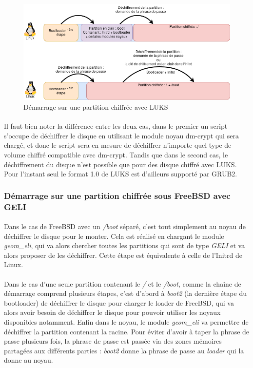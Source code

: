 \begin{figure}[h]
\centering
\includegraphics[width=.9\linewidth]{etat_art/DemarrageLinux.png}
\caption{\label{fig:demarrageLinux}Démarrage sur une partition chiffrée avec LUKS}
\end{figure}

\paragraph{}

Il faut bien noter la différence entre les deux cas, dans le premier un script
s'occupe de déchiffrer le disque en utilisant le module noyau dm-crypt qui sera
chargé, et donc le script sera en mesure de déchiffrer n'importe quel type de
volume chiffré compatible avec dm-crypt. Tandis que dans le second cas, le
déchiffrement du disque n'est possible que pour des disque chiffré avec LUKS.
Pour l'instant seul le format 1.0 de LUKS est d'ailleurs supporté par GRUB2.

\subsubsection{Démarrage sur une partition chiffrée sous FreeBSD avec GELI}

\paragraph{}
Dans le cas de FreeBSD avec un {\em /boot} séparé, c'est tout simplement au
noyau de déchiffrer le disque pour le monter. Cela est réalisé en chargant
le module {\em geom\_eli}, qui va alors chercher toutes les partitions qui sont
de type {\em GELI} et va alors proposer de les déchiffrer. Cette étape est
équivalente à celle de l'Initrd de Linux.

\paragraph{}
Dans le cas d'une seule partition contenant le {\em /} et le {\em /boot}, comme
la chaîne de démarrage comprend plusieurs étapes, c'est d'abord à {\em boot2}
(la dernière étape du bootloader) de déchiffrer le disque pour charger le loader
de FreeBSD, qui va alors avoir besoin de déchiffrer le disque pour pouvoir
utiliser les noyaux disponibles notamment. Enfin dans le noyau, le module
{\em geom\_eli} va permettre de déchiffrer la partition contenant la racine.
Pour éviter d'avoir à taper la phrase de passe plusieurs fois, la phrase de
passe est passée via des zones mémoires partagées aux différents parties :
{\em boot2} donne la phrase de passe au {\em loader} qui la donne au noyau.



